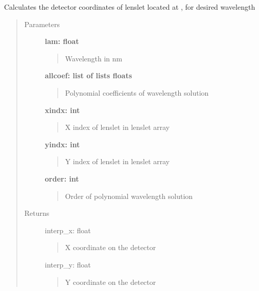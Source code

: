\documentclass[letterpaper,10pt,english]{sphinxmanual}
\begin{document}
\begin{fulllineitems}
\begin{fulllineitems}
\label{tools:tools.locate_psflets.PSFLets.return_locations}
Calculates the detector coordinates of lenslet located at , 
for desired wavelength 
\begin{quote}\begin{description}
\item[{Parameters}] \leavevmode
\textbf{lam: float}
\begin{quote}

Wavelength in nm
\end{quote}

\textbf{allcoef: list of lists floats}
\begin{quote}

Polynomial coefficients of wavelength solution
\end{quote}

\textbf{xindx: int}
\begin{quote}

X index of lenslet in lenslet array
\end{quote}

\textbf{yindx: int}
\begin{quote}

Y index of lenslet in lenslet array
\end{quote}

\textbf{order: int}
\begin{quote}

Order of polynomial wavelength solution
\end{quote}

\item[{Returns}] \leavevmode
interp\_x: float
\begin{quote}

X coordinate on the detector
\end{quote}

interp\_y: float
\begin{quote}

Y coordinate on the detector
\end{quote}

\end{description}\end{quote}

\end{fulllineitems}


\end{fulllineitems}
\end{document}

